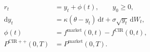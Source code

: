 \documentclass{equation-sheet}
\begin{document}
\begin{equation*}
\begin{aligned}
r_t &= y_t+\phi(t),\qquad y_0\geq0, \\[0.5em]
\mathrm{d}y_t
  &= \kappa(\theta-y_t)\,\mathrm{d}t+\sigma\sqrt{y_t}\,\mathrm{d}W_t, \\[0.5em]
\phi(t) &= f^{\mathrm{market}}(0,t)-f^{\mathrm{CIR}}(0,t), \\[0.5em]
P^{\mathrm{CIR++}}(0,T)&=P^{\mathrm{market}}(0,T).
\end{aligned}
\end{equation*}
\end{document}
